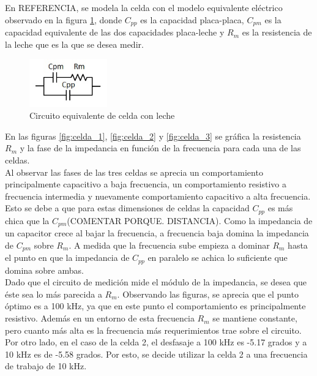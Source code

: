 En REFERENCIA, se modela la celda con el modelo equivalente eléctrico observado en la figura \ref{fig:celda_eq}, donde $C_{pp}$ es la capacidad placa-placa, $C_{pm}$ es la capacidad equivalente de las dos capacidades placa-leche y $R_{m}$ es la resistencia de la leche que es la que se desea medir.\\

\begin{figure}[H]
\centering
\includegraphics[width=0.3\textwidth]{Celda/celda_eq.jpg}
\caption{Circuito equivalente de celda con leche}
\label{fig:celda_eq}
\end{figure}

En las figuras \ref{fig:celda_1}, \ref{fig:celda_2} y \ref{fig:celda_3} se gráfica la resistencia $R_{m}$ y la fase de la impedancia en función de la frecuencia para cada una de las celdas.\\

Al observar las fases de las tres celdas se aprecia un comportamiento principalmente capacitivo a baja frecuencia, un comportamiento resistivo a frecuencia intermedia y nuevamente comportamiento capacitivo a alta frecuencia. Esto se debe a que para estas dimensiones de celdas la capacidad $C_{pp}$ es más chica que la $C_{pm}$(COMENTAR PORQUE. DISTANCIA). Como la impedancia de un capacitor crece al bajar la frecuencia, a frecuencia baja domina la impedancia de $C_{pm}$ sobre $R_{m}$. A medida que la frecuencia sube empieza a dominar $R_{m}$ hasta el punto en que la impedancia de $C_{pp}$ en paralelo se achica lo suficiente que domina sobre ambas.\\

Dado que el circuito de medición mide el módulo de la impedancia, se  desea que éste sea lo más parecida a $R_{m}$. Observando las figuras, se aprecia que el punto óptimo es a 100 kHz, ya que en este punto el comportamiento es principalmente resistivo. Además en un entorno de esta frecuencia $R_{m}$ se mantiene constante, pero cuanto más alta es la frecuencia más requerimientos trae sobre el circuito. Por otro lado, en el caso de la celda 2, el desfasaje a 100 kHz es -5.17 grados y a 10 kHz es de -5.58 grados. Por esto, se decide utilizar la celda 2 a una frecuencia de trabajo de 10 kHz.\\

